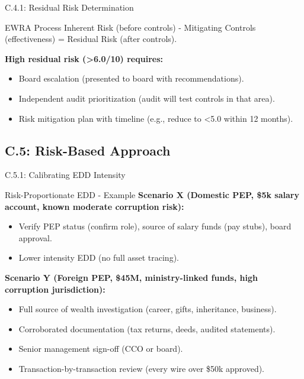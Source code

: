 \documentclass{beamer}
\begin{document}
	\begin{frame}{C.4.1: Residual Risk Determination}
		\begin{block}{EWRA Process}
			Inherent Risk (before controls) - Mitigating Controls (effectiveness) = Residual Risk (after controls).
		\end{block}
		\textbf{High residual risk (>6.0/10) requires:}
		\begin{itemize}
			\item Board escalation (presented to board with recommendations).
			\item Independent audit prioritization (audit will test controls in that area).
			\item Risk mitigation plan with timeline (e.g., reduce to <5.0 within 12 months).
		\end{itemize}
	\end{frame}
	
	\subsection{C.5: Risk-Based Approach}
	
	\begin{frame}{C.5.1: Calibrating EDD Intensity}
		\begin{block}{Risk-Proportionate EDD - Example}
			\textbf{Scenario X (Domestic PEP, \$5k salary account, known moderate corruption risk):}
			\begin{itemize}
				\item Verify PEP status (confirm role), source of salary funds (pay stubs), board approval.
				\item Lower intensity EDD (no full asset tracing).
			\end{itemize}
			\textbf{Scenario Y (Foreign PEP, \$45M, ministry-linked funds, high corruption jurisdiction):}
			\begin{itemize}
				\item Full source of wealth investigation (career, gifts, inheritance, business).
				\item Corroborated documentation (tax returns, deeds, audited statements).
				\item Senior management sign-off (CCO or board).
				\item Transaction-by-transaction review (every wire over \$50k approved).
			\end{itemize}
		\end{block}
	\end{frame}
	
\end{document}
